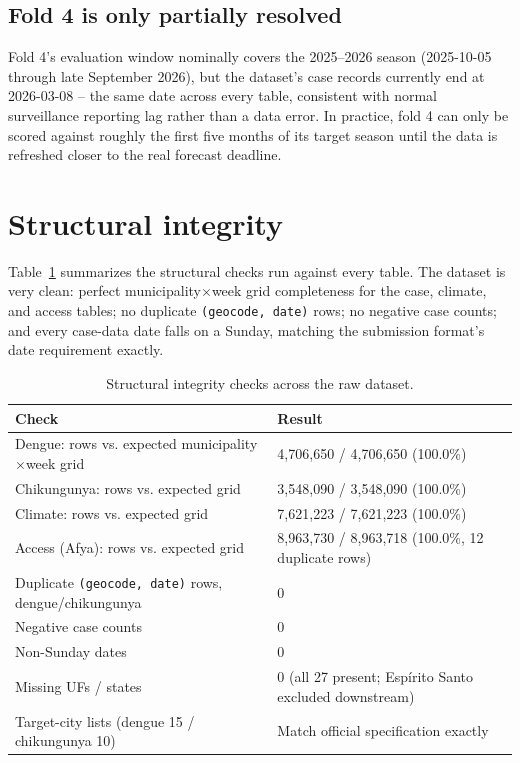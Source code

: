\documentclass[11pt]{report}
\begin{document}
\subsection*{Fold 4 is only partially resolved}
Fold 4's evaluation window nominally covers the 2025--2026 season (2025-10-05 through late September 2026), but the dataset's case records currently end at 2026-03-08 -- the same date across every table, consistent with normal surveillance reporting lag rather than a data error. In practice, fold 4 can only be scored against roughly the first five months of its target season until the data is refreshed closer to the real forecast deadline.

\section{Structural integrity}
Table~\ref{tab:integrity} summarizes the structural checks run against every table. The dataset is very clean: perfect municipality$\times$week grid completeness for the case, climate, and access tables; no duplicate \texttt{(geocode, date)} rows; no negative case counts; and every case-data date falls on a Sunday, matching the submission format's date requirement exactly.

\begin{table}[htbp]
\centering
\small
\begin{tabular}{@{}p{7.7cm}p{7cm}@{}}
\toprule
\textbf{Check} & \textbf{Result} \\
\midrule
Dengue: rows vs. expected municipality$\times$week grid & 4{,}706{,}650 / 4{,}706{,}650 (100.0\%) \\
Chikungunya: rows vs. expected grid & 3{,}548{,}090 / 3{,}548{,}090 (100.0\%) \\
Climate: rows vs. expected grid & 7{,}621{,}223 / 7{,}621{,}223 (100.0\%) \\
Access (Afya): rows vs. expected grid & 8{,}963{,}730 / 8{,}963{,}718 (100.0\%, 12 duplicate rows) \\
Duplicate \texttt{(geocode, date)} rows, dengue/chikungunya & 0 \\
Negative case counts & 0 \\
Non-Sunday dates & 0 \\
Missing UFs / states & 0 (all 27 present; Esp\'irito Santo excluded downstream) \\
Target-city lists (dengue 15 / chikungunya 10) & Match official specification exactly \\
\bottomrule
\end{tabular}
\caption{Structural integrity checks across the raw dataset.}
\label{tab:integrity}
\end{table}
\end{document}
